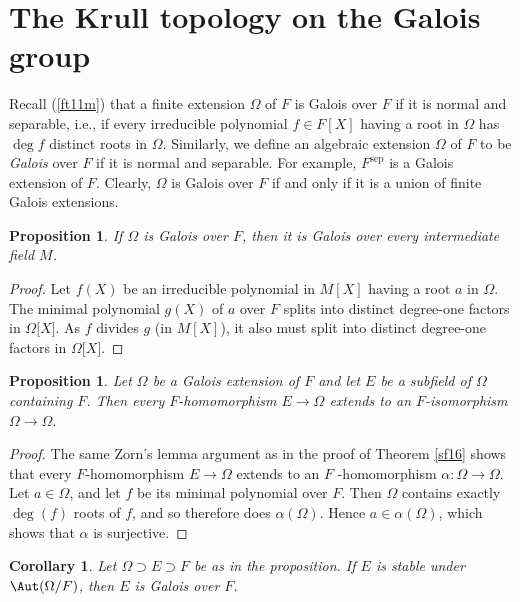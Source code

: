 \documentclass[a4paper,11pt,final,openany]{memoir}
\newtheorem{corollary}[X]{Corollary}
\newtheorem{proposition}[X]{Proposition}
\theoremstyle{nonumberplain}
\newtheorem{proof}{Proof.}
\begin{document}
\section{ The Krull topology on the Galois group}

Recall (\ref{ft11m}) that a finite extension $\Omega$ of $F$ is Galois over
$F$ if it is normal and separable, i.e., if every irreducible polynomial $f\in
F[X]$ having a root in $\Omega$ has $\deg f$ distinct roots in $\Omega$.
Similarly, we define an algebraic extension $\Omega$ of $F$ to be
\emph{Galois}%
%
\emph{\/} over $F$ if it is normal and separable. For example,
$F^{\mathrm{sep}}$ is a Galois extension of $F$. Clearly, $\Omega$ is Galois
over $F$ if and only if it is a union of finite Galois extensions.

\begin{proposition}
\label{ag1a}If $\Omega$ is Galois over $F$, then it is Galois over every
intermediate field $M$.
\end{proposition}

\begin{proof}
Let $f(X)$ be an irreducible polynomial in $M[X]$ having a root $a$ in
$\Omega$. The minimal polynomial $g(X)$ of $a$ over $F$ splits into distinct
degree-one factors in $\Omega\lbrack X]$. As $f$ divides $g$ (in $M[X]$), it
also must split into distinct degree-one factors in $\Omega\lbrack X]$.
\end{proof}

\begin{proposition}
\label{ig2a}Let $\Omega$ be a Galois extension of $F$ and let $E$ be a
subfield of $\Omega$ containing $F$. Then every $F$-homomorphism
$E\rightarrow\Omega$ extends to an $F$-isomorphism $\Omega\rightarrow\Omega$.
\end{proposition}

\begin{proof}
The same Zorn's lemma argument as in the proof of Theorem \ref{sf16} shows
that every $F$-homomorphism $E\rightarrow\Omega$ extends to an $F$%
-homomorphism $\alpha\colon\Omega\rightarrow\Omega$. Let $a\in\Omega$, and let
$f$ be its minimal polynomial over $F$. Then $\Omega$ contains exactly
$\deg(f)$ roots of $f$, and so therefore does $\alpha(\Omega)$. Hence
$a\in\alpha(\Omega)$, which shows that $\alpha$ is surjective.
\end{proof}

\begin{corollary}
\label{ig2b}Let $\Omega\supset E\supset F$ be as in the proposition. If $E$ is
stable under $\Aut(\Omega/F)$, then $E$ is Galois over $F$.
\end{corollary}
\end{document}
